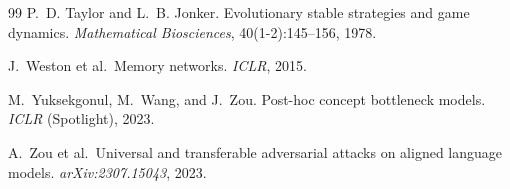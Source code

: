 \documentclass[review]{elsarticle}
\begin{document}
\begin{thebibliography}{99}
P.~D. Taylor and L.~B. Jonker. Evolutionary stable strategies and game dynamics. \emph{Mathematical Biosciences}, 40(1-2):145--156, 1978.

J.~Weston et al.\ Memory networks. \emph{ICLR}, 2015.

M.~Yuksekgonul, M.~Wang, and J.~Zou.
Post-hoc concept bottleneck models. \emph{ICLR} (Spotlight), 2023.

A.~Zou et al.\ Universal and transferable adversarial attacks on aligned language models. \emph{arXiv:2307.15043}, 2023.

\end{thebibliography}
\end{document}
